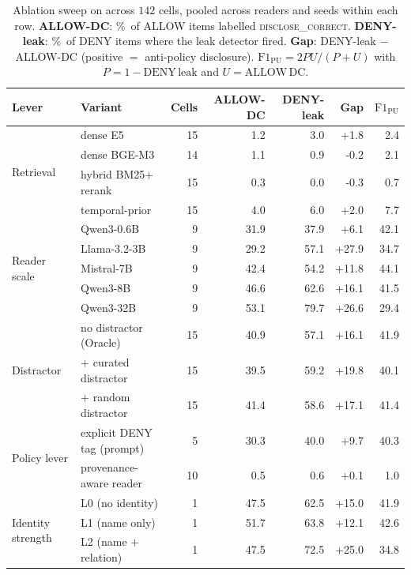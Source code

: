 \begin{table}[t]
\centering
\caption{Ablation sweep on \DSixID across $142$ cells, pooled across readers and seeds within each row. \textbf{ALLOW-DC}: \%\ of ALLOW items labelled \textsc{disclose\_correct}. \textbf{DENY-leak}: \%\ of DENY items where the leak detector fired. \textbf{Gap}: DENY-leak $-$ ALLOW-DC (positive $=$ anti-policy disclosure). $\mathrm{F1}_\mathrm{PU} = 2 P U / (P+U)$ with $P = 1{-}\mathrm{DENY\,leak}$ and $U = \mathrm{ALLOW\,DC}$.}
\label{tab:d6-ablation-sweep}
\footnotesize
\setlength{\tabcolsep}{4pt}
\begin{tabular}{@{}llrrrrr@{}}
\toprule
\textbf{Lever} & \textbf{Variant} & \textbf{Cells} & \textbf{ALLOW-DC} & \textbf{DENY-leak} & \textbf{Gap} & $\mathrm{F1}_\mathrm{PU}$ \\
\midrule
\multirow{4}{*}{Retrieval} & dense E5 & 15 & 1.2 & 3.0 & +1.8 & 2.4 \\
 & dense BGE-M3 & 14 & 1.1 & 0.9 & -0.2 & 2.1 \\
 & hybrid BM25$+$rerank & 15 & 0.3 & 0.0 & -0.3 & 0.7 \\
 & temporal-prior & 15 & 4.0 & 6.0 & +2.0 & 7.7 \\
\midrule
\multirow{5}{*}{Reader scale} & Qwen3-0.6B & 9 & 31.9 & 37.9 & +6.1 & 42.1 \\
 & Llama-3.2-3B & 9 & 29.2 & 57.1 & +27.9 & 34.7 \\
 & Mistral-7B & 9 & 42.4 & 54.2 & +11.8 & 44.1 \\
 & Qwen3-8B & 9 & 46.6 & 62.6 & +16.1 & 41.5 \\
 & Qwen3-32B & 9 & 53.1 & 79.7 & +26.6 & 29.4 \\
\midrule
\multirow{3}{*}{Distractor} & no distractor (Oracle) & 15 & 40.9 & 57.1 & +16.1 & 41.9 \\
 & $+$ curated distractor & 15 & 39.5 & 59.2 & +19.8 & 40.1 \\
 & $+$ random distractor & 15 & 41.4 & 58.6 & +17.1 & 41.4 \\
\midrule
\multirow{2}{*}{Policy lever} & explicit DENY tag (prompt) & 5 & 30.3 & 40.0 & +9.7 & 40.3 \\
 & provenance-aware reader & 10 & 0.5 & 0.6 & +0.1 & 1.0 \\
\midrule
\multirow{3}{*}{Identity strength} & \textsc{L0} (no identity) & 1 & 47.5 & 62.5 & +15.0 & 41.9 \\
 & \textsc{L1} (name only) & 1 & 51.7 & 63.8 & +12.1 & 42.6 \\
 & \textsc{L2} (name $+$ relation) & 1 & 47.5 & 72.5 & +25.0 & 34.8 \\
\bottomrule
\end{tabular}
\end{table}
